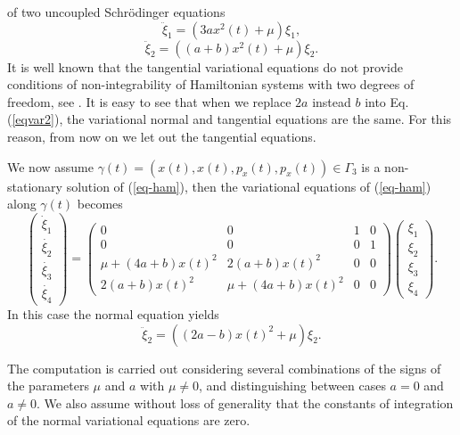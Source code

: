 \documentclass[final]{siamart0516}
\begin{document}
of two uncoupled Schr\"odinger equations 
\begin{equation}\label{eqvar1}
\ddot\xi_1=\left(3ax^2(t)+\mu\right)\xi_1,
\end{equation}     
\begin{equation}\label{eqvar2}
\ddot\xi_2=\left((a+b)x^2(t)+\mu\right)\xi_2.\end{equation}  
It is well known that the tangential variational equations do not provide conditions of non-integrability of Hamiltonian systems with two degrees of freedom, see \cite{mora1}. It is easy to see that when we replace  $2a$ instead $b$ into 
Eq. (\ref{eqvar2}),  the variational normal and tangential equations are the same.  For this reason, from now on  we let out the tangential equations.

We now assume $\gamma (t)= (x(t), x(t), p_x(t), p_x(t))\in\Gamma_3$  is a non-stationary solution of (\ref{eq-ham}), then the variational equations of
(\ref{eq-ham}) along $\gamma (t)$ becomes
\begin{equation*}
\left( \begin{array}{c}\dot{\xi}_1 \\ \dot{\xi_2} \\ \dot{\xi_3} \\  \dot{\xi_4} \end{array}\right)
=\begin{pmatrix}
0 & 0 & 1 & 0\\ 0 & 0 & 0 & 1\\ \mu + (4a+b)x(t)^2 & 2(a+b)x(t)^2 & 0 & 0\\ 2(a+b)x(t)^2 & \mu +(4a+b)x(t)^2 & 0 & 0
\end{pmatrix}
\left( \begin{array}{c}  \xi_1 \\  \xi_2  \\  \xi_3  \\  \xi_4 \end{array} \right).
\end{equation*}
%
In this case the normal equation yields
\begin{equation}\label{eqvar2b}
\ddot\xi_2=\left((2a-b)x(t)^2+\mu\right)\xi_2.\end{equation}  

The computation is  carried out considering several combinations of the signs of the parameters $\mu$ and $a$ with
$\mu\neq 0$,  and distinguishing between cases $a=0$ and $a\neq 0$.  
We also assume  without loss of generality that the constants of integration of the normal variational equations are zero.
\end{document}
